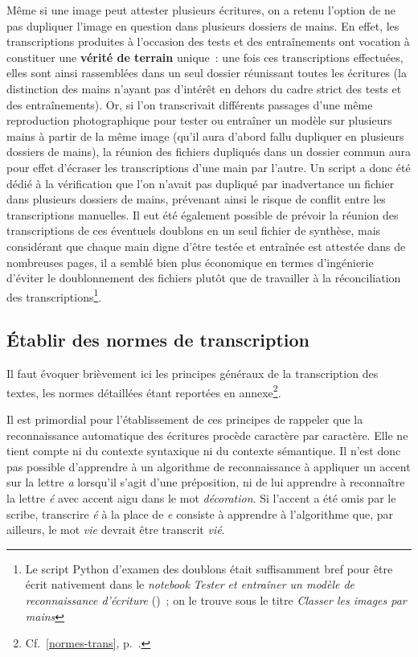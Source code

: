 \documentclass[a4paper,12pt,twoside]{book}
\begin{document}
				\pagebreak
				
				Même si une image peut attester plusieurs écritures, on a retenu l'option de ne pas dupliquer l'image en question dans plusieurs dossiers de mains. En effet, les transcriptions produites à l'occasion des tests et des entraînements ont vocation à constituer une \textbf{vérité de terrain} unique~: une fois ces transcriptions effectuées, elles sont ainsi rassemblées dans un seul dossier réunissant toutes les écritures (la distinction des mains n'ayant pas d'intérêt en dehors du cadre strict des tests et des entraînements). Or, si l'on transcrivait différents passages d'une même reproduction photographique pour tester ou entraîner un modèle sur plusieurs mains à partir de la même image (qu'il aura d'abord fallu dupliquer en plusieurs dossiers de mains), la réunion des fichiers dupliqués dans un dossier commun aura pour effet d'écraser les transcriptions d'une main par l'autre. Un script a donc été dédié à la vérification que l'on n'avait pas dupliqué par inadvertance un fichier dans plusieurs dossiers de mains, prévenant ainsi le risque de conflit entre les transcriptions manuelles. Il eut été également possible de prévoir la réunion des transcriptions de ces éventuels doublons en un seul fichier de synthèse, mais considérant que chaque main digne d'être testée et entraînée est attestée dans de nombreuses pages, il a semblé bien plus économique en termes d'ingénierie d'éviter le doublonnement des fichiers plutôt que de travailler à la réconciliation des transcriptions\footnote{Le script Python d'examen des doublons était suffisamment bref pour être écrit nativement dans le \textit{notebook} \textit{Tester et entraîner un modèle de reconnaissance d'écriture} (\cite{biayTesterEntrainerModele2022})~; on le trouve sous le titre \textit{Classer les images par mains}}.

			\subsection{Établir des normes de transcription}
				Il faut évoquer brièvement ici les principes généraux de la transcription des textes, les normes détaillées étant reportées en annexe\footnote{Cf.~\ref{normes-trans}, p.~\pageref{normes-trans}.}.
				
				Il est primordial pour l'établissement de ces principes de rappeler que la reconnaissance automatique des écritures procède caractère par caractère. Elle ne tient compte ni du contexte syntaxique ni du contexte sémantique. Il n'est donc pas possible d'apprendre à un algorithme de reconnaissance à appliquer un accent sur la lettre \textit{a} lorsqu'il s'agit d'une préposition, ni de lui apprendre à reconnaître la lettre \textit{é} avec accent aigu dans le mot \textit{décoration}. Si l'accent a été omis par le scribe, transcrire \textit{é} à la place de \textit{e} consiste à apprendre à l'algorithme que, par ailleurs, le mot \textit{vie} devrait être transcrit \textit{vié}.
				
\end{document}
